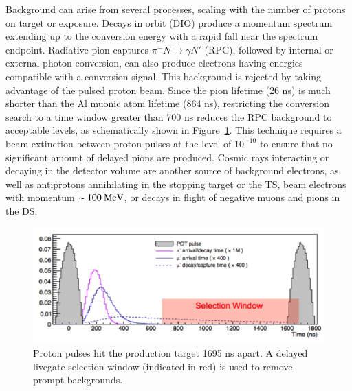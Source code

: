 Background can arise from several processes, scaling with the number of protons on target or exposure. Decays in orbit (DIO) produce a momentum spectrum extending up to the conversion energy with a rapid fall near the spectrum endpoint. Radiative pion captures $\pi^- N \rightarrow \gamma N'$ (RPC), followed by internal or external photon conversion, can also produce electrons having energies compatible with a conversion signal. This background is rejected by taking advantage of the pulsed proton beam. Since the pion lifetime (26 ns) is much shorter than the Al muonic atom lifetime (864 ns), restricting the conversion search to a time window greater than 700 ns reduces the RPC background to acceptable levels, as schematically shown in Figure~\ref{fig:Mu2ePulse}. This technique requires a beam extinction between proton pulses at the level of $10^{-10}$ to ensure that no significant amount of delayed pions are produced. Cosmic rays interacting or decaying in the detector volume are another source of background electrons, as well as antiprotons annihilating in the stopping target or the TS, beam electrons with momentum $\sim 100 ~\mbox{MeV}$, or decays in flight of negative muons and pions in the DS. 
%
\begin{figure}[ht!]
\begin{center}
\includegraphics[width=0.9\linewidth]{figures/Mu2ePulse.png}
\caption{Proton pulses hit the production target 1695 ns apart. A delayed livegate selection window (indicated in red) is used to remove prompt backgrounds.}
\label{fig:Mu2ePulse}
\end{center}
\end{figure}
%
